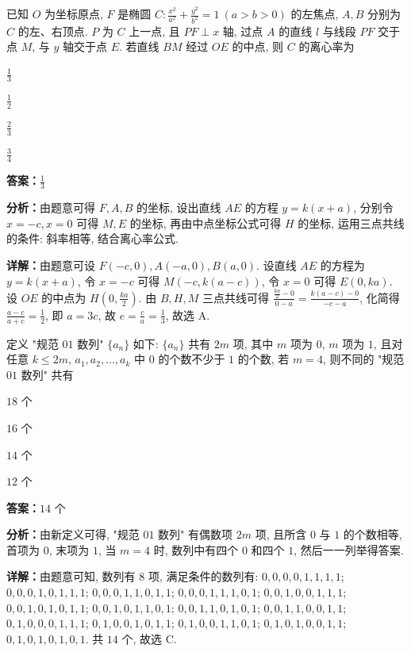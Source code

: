 \begin{question}[points=5]
已知 $O$ 为坐标原点, $F$ 是椭圆 $C:\frac{x^2}{a^2}+\frac{y^2}{b^2}=1\ (a>b>0)$ 的左焦点, $A,B$ 分别为 $C$ 的左、右顶点. $P$ 为 $C$ 上一点, 且 $PF\perp x$ 轴, 过点 $A$ 的直线 $l$ 与线段 $PF$ 交于点 $M$, 与 $y$ 轴交于点 $E$. 若直线 $BM$ 经过 $OE$ 的中点, 则 $C$ 的离心率为
\begin{choices}
  \item $\frac{1}{3}$
  \item $\frac{1}{2}$
  \item $\frac{2}{3}$
  \item $\frac{3}{4}$
\end{choices}
\begin{solution}
\textbf{答案：}$\frac{1}{3}$

\textbf{分析：}由题意可得 $F,A,B$ 的坐标, 设出直线 $AE$ 的方程 $y=k(x+a)$, 分别令 $x=-c,x=0$ 可得 $M,E$ 的坐标, 再由中点坐标公式可得 $H$ 的坐标, 运用三点共线的条件: 斜率相等, 结合离心率公式.

\textbf{详解：}由题意可设 $F(-c,0),A(-a,0),B(a,0)$. 设直线 $AE$ 的方程为 $y=k(x+a)$, 令 $x=-c$ 可得 $M(-c,k(a-c))$, 令 $x=0$ 可得 $E(0,ka)$. 设 $OE$ 的中点为 $H(0,\frac{ka}{2})$. 由 $B,H,M$ 三点共线可得 $\frac{\frac{ka}{2}-0}{0-a}=\frac{k(a-c)-0}{-c-a}$, 化简得 $\frac{a-c}{a+c}=\frac{1}{2}$, 即 $a=3c$, 故 $e=\frac{c}{a}=\frac{1}{3}$, 故选 A.
\end{solution}
\end{question}

\begin{question}[points=5]
定义 "规范 $01$ 数列" $\{a_n\}$ 如下: $\{a_n\}$ 共有 $2m$ 项, 其中 $m$ 项为 $0$, $m$ 项为 $1$, 且对任意 $k\le 2m$, $a_1,a_2,\dots,a_k$ 中 $0$ 的个数不少于 $1$ 的个数, 若 $m=4$, 则不同的 "规范 $01$ 数列" 共有
\begin{choices}
  \item $18$ 个
  \item $16$ 个
  \item $14$ 个
  \item $12$ 个
\end{choices}
\begin{solution}
\textbf{答案：}$14$ 个

\textbf{分析：}由新定义可得, "规范 $01$ 数列" 有偶数项 $2m$ 项, 且所含 $0$ 与 $1$ 的个数相等, 首项为 $0$, 末项为 $1$, 当 $m=4$ 时, 数列中有四个 $0$ 和四个 $1$, 然后一一列举得答案.

\textbf{详解：}由题意可知, 数列有 $8$ 项, 满足条件的数列有: $0,0,0,0,1,1,1,1$; $0,0,0,1,0,1,1,1$; $0,0,0,1,1,0,1,1$; $0,0,0,1,1,1,0,1$; $0,0,1,0,0,1,1,1$; $0,0,1,0,1,0,1,1$; $0,0,1,0,1,1,0,1$; $0,0,1,1,0,1,0,1$; $0,0,1,1,0,0,1,1$; $0,1,0,0,0,1,1,1$; $0,1,0,0,1,0,1,1$; $0,1,0,0,1,1,0,1$; $0,1,0,1,0,0,1,1$; $0,1,0,1,0,1,0,1$. 共 $14$ 个, 故选 C.
\end{solution}
\end{question}

